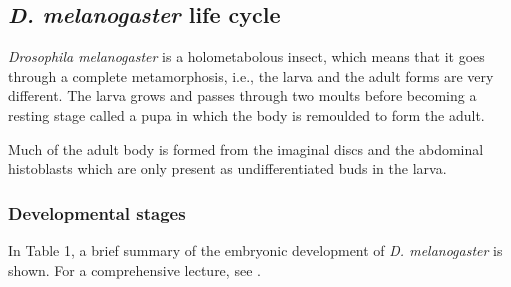 \subsection{\textit{D. melanogaster} life cycle}

\textit{Drosophila melanogaster} is a holometabolous insect, which means that it goes through a complete metamorphosis, i.e., the larva and the adult forms are very different.
The larva grows and passes through two moults before becoming a resting stage called a pupa in which
the body is remoulded to form the adult. 

Much of the adult body is formed
from the imaginal discs and the abdominal histoblasts which are only present
as undifferentiated buds in the larva.

\subsubsection{Developmental stages}

In Table 1, a brief summary of the embryonic development of \textit{D. melanogaster} is shown. For a comprehensive lecture, see \citep{Campos-Ortega1985,Roberts1998,Gilbert2014}.

